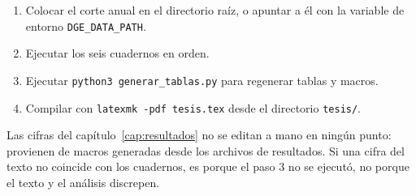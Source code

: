 \begin{enumerate}[leftmargin=*]
  \item Colocar el corte anual \texttt{\cohorteFuente} en el directorio raíz, o
    apuntar a él con la variable de entorno \texttt{DGE\_DATA\_PATH}.
  \item Ejecutar los seis cuadernos en orden.
  \item Ejecutar \texttt{python3 generar\_tablas.py} para regenerar tablas y
    macros.
  \item Compilar con \texttt{latexmk -pdf tesis.tex} desde el directorio
    \texttt{tesis/}.
\end{enumerate}

Las cifras del capítulo~\ref{cap:resultados} no se editan a mano en ningún punto:
provienen de macros generadas desde los archivos de resultados. Si una cifra del
texto no coincide con los cuadernos, es porque el paso 3 no se ejecutó, no porque
el texto y el análisis discrepen.
